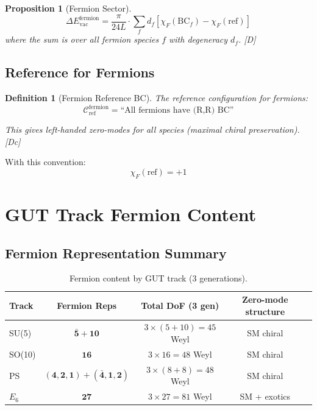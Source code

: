 \documentclass[11pt,a4paper]{article}
\newtheorem{proposition}[theorem]{Proposition}
\newtheorem{definition}[theorem]{Definition}
\newcommand{\tagD}{\textcolor{blue!70!black}{[D]}}
\newcommand{\tagDc}{\textcolor{blue!50!black}{[Dc]}}
\begin{document}
\begin{proposition}[Fermion Sector]
\label{prop:fermion-sector}
\begin{equation}
\label{eq:fermion-formula}
\Delta E_{\text{vac}}^{\text{fermion}} = \frac{\pi}{24L} \cdot \sum_f d_f [\chi_F(\text{BC}_f) - \chi_F(\text{ref})]
\end{equation}
where the sum is over all fermion species $f$ with degeneracy $d_f$. \tagD
\end{proposition}

\subsection{Reference for Fermions}

\begin{definition}[Fermion Reference BC]
\label{def:ferm-ref}
The reference configuration for fermions:
\begin{equation}
\label{eq:ferm-ref}
\mathcal{C}_{\text{ref}}^{\text{fermion}} = \text{``All fermions have (R,R) BC''}
\end{equation}

This gives left-handed zero-modes for all species (maximal chiral preservation). \tagDc
\end{definition}

With this convention:
\begin{equation}
\label{eq:ferm-ref-chi}
\chi_F(\text{ref}) = +1
\end{equation}

\section{GUT Track Fermion Content}
\label{sec:tracks}

\subsection{Fermion Representation Summary}

\begin{table}[h]
\centering
\begin{tabular}{lcccc}
\toprule
Track & Fermion Reps & Total DoF (3 gen) & Zero-mode structure \\
\midrule
SU(5) & $\bar{\mathbf{5}} + \mathbf{10}$ & $3 \times (5 + 10) = 45$ Weyl & SM chiral \\
SO(10) & $\mathbf{16}$ & $3 \times 16 = 48$ Weyl & SM chiral \\
PS & $(\mathbf{4},\mathbf{2},\mathbf{1}) + (\bar{\mathbf{4}},\mathbf{1},\mathbf{2})$ & $3 \times (8 + 8) = 48$ Weyl & SM chiral \\
$E_6$ & $\mathbf{27}$ & $3 \times 27 = 81$ Weyl & SM + exotics \\
\bottomrule
\end{tabular}
\caption{Fermion content by GUT track (3 generations).}
\label{tab:ferm-content}
\end{table}
\end{document}
